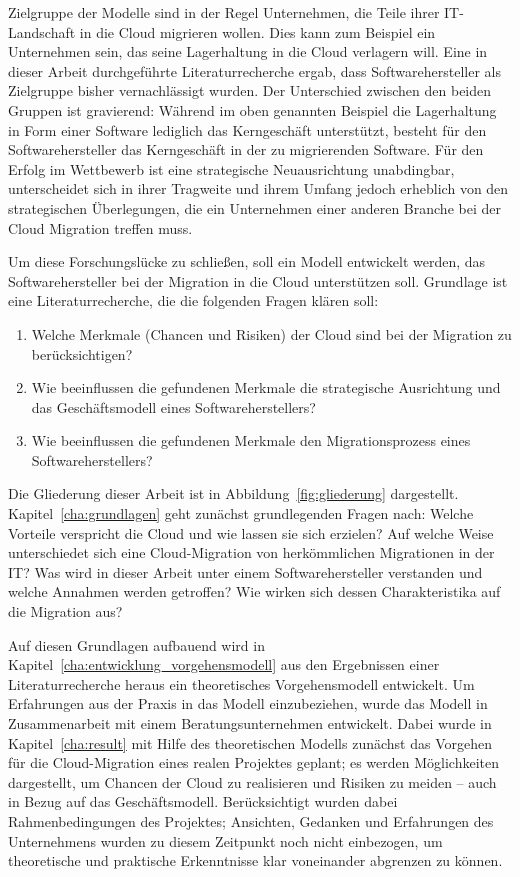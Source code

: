 Zielgruppe der Modelle sind in der Regel Unternehmen, die Teile ihrer
IT-Landschaft in die Cloud migrieren wollen. Dies kann zum Beispiel ein
Unternehmen sein, das
seine Lagerhaltung in die Cloud verlagern will. Eine in
dieser Arbeit durchgeführte Literaturrecherche ergab,
dass Softwarehersteller als Zielgruppe bisher vernachlässigt wurden. Der
Unterschied zwischen den beiden Gruppen ist gravierend: Während im oben
genannten Beispiel die
Lagerhaltung in Form einer Software lediglich das Kerngeschäft unterstützt,
besteht für den Softwarehersteller das Kerngeschäft in der zu migrierenden
Software. Für den Erfolg im Wettbewerb ist eine strategische
Neuausrichtung
unabdingbar, unterscheidet sich in ihrer Tragweite und ihrem Umfang jedoch
erheblich von den strategischen Überlegungen, die ein Unternehmen einer anderen
Branche bei der Cloud Migration treffen muss.

Um diese Forschungslücke zu schließen, soll ein Modell entwickelt werden, das
Softwarehersteller bei der Migration in die Cloud unterstützen soll. Grundlage
ist eine Literaturrecherche, die die folgenden Fragen klären soll:
\begin{enumerate}
	\item Welche Merkmale (Chancen und Risiken) der Cloud sind bei der
Migration zu berücksichtigen?
	\item Wie beeinflussen die gefundenen Merkmale die strategische
Ausrichtung und das Geschäftsmodell eines Softwareherstellers?
	\item Wie beeinflussen die gefundenen Merkmale den Migrationsprozess
eines Softwareherstellers?
\end{enumerate}

Die Gliederung dieser Arbeit ist in Abbildung~\ref{fig:gliederung} dargestellt.
Kapitel~\ref{cha:grundlagen} geht zunächst grundlegenden Fragen nach:
Welche Vorteile verspricht die Cloud und wie lassen sie sich erzielen? Auf
welche Weise unterschiedet sich eine Cloud-Migration von herkömmlichen
Migrationen in der IT? Was wird in dieser Arbeit unter einem Softwarehersteller
verstanden und welche Annahmen werden getroffen? Wie wirken sich dessen
Charakteristika auf die Migration aus?

Auf diesen Grundlagen aufbauend wird in Kapitel~\ref{cha:entwicklung_vorgehensmodell} aus den Ergebnissen einer Literaturrecherche heraus ein theoretisches Vorgehensmodell entwickelt. Um Erfahrungen aus der Praxis in das Modell einzubeziehen, wurde das Modell in
Zusammenarbeit mit einem Beratungsunternehmen entwickelt. Dabei wurde in Kapitel~\ref{cha:result} mit Hilfe des theoretischen Modells zunächst das Vorgehen für die Cloud-Migration eines realen Projektes geplant; es werden Möglichkeiten dargestellt, um Chancen der Cloud zu realisieren und Risiken zu meiden -- auch in Bezug auf das Geschäftsmodell. Berücksichtigt wurden dabei Rahmenbedingungen des Projektes; Ansichten, Gedanken und Erfahrungen des Unternehmens wurden zu diesem Zeitpunkt noch nicht einbezogen, um theoretische und praktische Erkenntnisse klar voneinander abgrenzen zu können.

